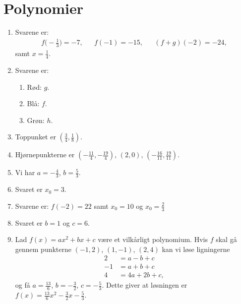 \newpage
\section{Polynomier}
\begin{enumerate}
	\item Svarene er:
	\begin{align*}
	f\Big(-\frac{1}{3}\Big)=-7,&&f(-1)=-15,&& (f+g)(-2)=-24,
	\end{align*} 
	samt $x=\frac{1}{4}$.
	
	\item \label{it:poly1ans} Svarene er:
	\begin{enumerate}
		\item Rød: $g$.
		\item Blå: $f$.
		\item Grøn: $h$.
	\end{enumerate}
	
	\item Toppunket er $ (\frac{3}{4},\frac{1}{8}) $.
	
	\item Hjørnepunkterne er $(-\frac{11}{4},-\frac{19}{4})$, $ (2,0) $, $ (-\frac{16}{11},\frac{19}{11}) $.
	
	\item Vi har $a=-\frac{4}{3}$, $ b=\frac{5}{3} $.
	
	\item Svaret er $ x_0=3 $.
	
	\item Svarene er: $ f(-2)=22 $ samt $x_0=10$ og $x_0=\frac{2}{3}$
	
	\item Svaret er $b=1$ og $c=6$.
	
	\item Lad $f(x)=ax^2+bx+c$ være et vilkårligt polynomium. Hvis $f$ skal gå gennem punkterne $(-1,2)$, $(1,-1)$, $(2,4)$ kan vi løse ligningerne
	\begin{align*}
	2&=a-b+c\\
	-1&=a+b+c\\
	4&=4a+2b+c,
	\end{align*}
	og få $ a=\frac{13}{6} $, $ b=-\frac{3}{2} $, $ c=-\frac{5}{3} $. Dette giver at løsningen er $ f(x)=\frac{13}{6}x^2-\frac{3}{2}x-\frac{5}{3} $.
	

\end{enumerate}
